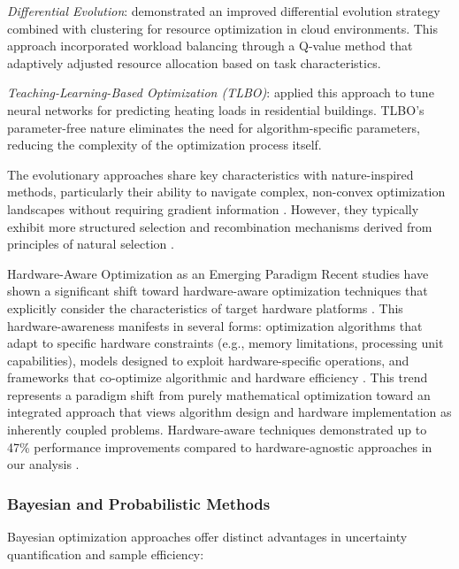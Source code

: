 \documentclass[acmsmall]{acmart}
\begin{document}
\textit{Differential Evolution}: \citet{Zhou20211} demonstrated an improved differential evolution strategy combined with clustering for resource optimization in cloud environments. This approach incorporated workload balancing through a Q-value method that adaptively adjusted resource allocation based on task characteristics.

\textit{Teaching-Learning-Based Optimization (TLBO)}: \citet{Almutairi20225924} applied this approach to tune neural networks for predicting heating loads in residential buildings. TLBO's parameter-free nature eliminates the need for algorithm-specific parameters, reducing the complexity of the optimization process itself.

The evolutionary approaches share key characteristics with nature-inspired methods, particularly their ability to navigate complex, non-convex optimization landscapes without requiring gradient information \citep{Yang2019}. However, they typically exhibit more structured selection and recombination mechanisms derived from principles of natural selection \citep{Back1996}.

\begin{themebox}{Hardware-Aware Optimization as an Emerging Paradigm}
    Recent studies have shown a significant shift toward hardware-aware optimization techniques that explicitly consider the characteristics of target hardware platforms \citep{Kim2022}. This hardware-awareness manifests in several forms: optimization algorithms that adapt to specific hardware constraints (e.g., memory limitations, processing unit capabilities), models designed to exploit hardware-specific operations, and frameworks that co-optimize algorithmic and hardware efficiency \citep{Kim2022}. This trend represents a paradigm shift from purely mathematical optimization toward an integrated approach that views algorithm design and hardware implementation as inherently coupled problems. Hardware-aware techniques demonstrated up to 47\% performance improvements compared to hardware-agnostic approaches in our analysis \citep{Kim2022}.
\end{themebox}

\subsubsection{Bayesian and Probabilistic Methods}\label{subsubsec:numerical-methods-for-deep-learning-on-big-data-rq11:bayesian-and-probabilistic-methods}
Bayesian optimization approaches offer distinct advantages in uncertainty quantification and sample efficiency:
\end{document}
